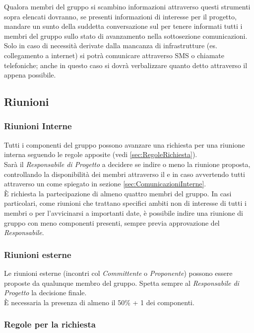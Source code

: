 \documentclass{scalatekids-article}
\begin{document}
Qualora membri del gruppo si scambino informazioni attraverso questi strumenti
sopra elencati dovranno, se presenti informazioni di interesse per il progetto,
mandare un sunto della suddetta conversazione sul  per tenere
informati tutti i membri del gruppo sullo stato di avanzamento nella
sottosezione comunicazioni.\\ Solo in caso di necessità derivate dalla mancanza
di infrastrutture (es. collegamento a internet) si potrà comunicare attraverso
SMS o chiamate telefoniche; anche in questo caso si dovrà verbalizzare quanto
detto attraverso il  appena possibile.

\subsection{Riunioni}

\subsubsection{Riunioni Interne}

Tutti i componenti del gruppo possono avanzare una richiesta per una riunione
interna seguendo le regole apposite (vedi \ref{sec:RegoleRichiesta}).\\
Sarà il \textit{Responsabile di Progetto} a decidere se indire
o meno la riunione proposta, controllando la disponibilità dei membri attraverso il
 e in caso avvertendo tutti attraverso un  come
spiegato in sezione \ref{sec:ComunicazioniInterne}.\\ È richiesta la partecipazione di
almeno quattro membri del gruppo. In casi particolari, come riunioni che
trattano specifici ambiti non di interesse di tutti i membri o per l'avvicinarsi
a importanti date, è possibile indire una riunione di gruppo con meno componenti
presenti, sempre previa approvazione del \textit{Responsabile}.

\subsubsection{Riunioni esterne}

Le riunioni esterne (incontri col \textit{Committente} o \textit{Proponente}) possono essere
proposte da qualunque membro del gruppo. Spetta sempre al \textit{Responsabile
di Progetto} la decisione finale.\\ È necessaria la presenza di almeno il
50\% + 1 dei componenti.

\subsubsection{Regole per la richiesta}
\end{document}

